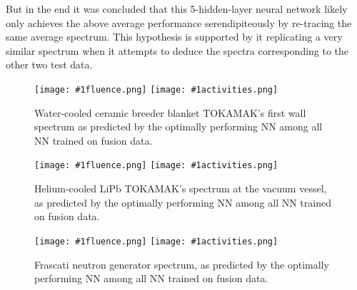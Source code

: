\documentclass[a4paper, 12pt]{article}
\newcommand{\fluenceandactivities}[1]{
\texttt{[image: \#1fluence.png]}
\texttt{[image: \#1activities.png]}
}
\begin{document}
But in the end it was concluded that this 5-hidden-layer neural network likely only achieves the above average performance serendipiteously by re-tracing the same average spectrum. This hypothesis is supported by it replicating a very similar spectrum when it attempts to deduce the spectra corresponding to the other two test data. 

\begin{figure}[H]
\centering
\fluenceandactivities{/home/ocean/Documents/GitHubDir/unfolding/unfolding/unfoldingsuite/neuralnetwork/realoutputEarlyStopping/SelectedNNreplicated/fusion-fusion/0918_0332_5_layer_top_right_anomaly_test_001_}
\caption{Water-cooled ceramic breeder blanket TOKAMAK's first wall spectrum as predicted by the optimally performing NN among all NN trained on fusion data.}\label{5Layerfusion-fusionWCCB-FW}
\end{figure}

\begin{figure}[H]
\centering
\fluenceandactivities{/home/ocean/Documents/GitHubDir/unfolding/unfolding/unfoldingsuite/neuralnetwork/realoutputEarlyStopping/SelectedNNreplicated/fusion-fusion/0918_0332_5_layer_top_right_anomaly_test_001_}
\caption{Helium-cooled LiPb TOKAMAK's spectrum at the vacuum vessel, as predicted by the optimally performing NN among all NN trained on fusion data.}\label{5Layerfusion-fusionHCLL-VV}
\end{figure}

\begin{figure}[H]
\centering
\fluenceandactivities{/home/ocean/Documents/GitHubDir/unfolding/unfolding/unfoldingsuite/neuralnetwork/realoutputEarlyStopping/SelectedNNreplicated/fusion-fusion/0918_0332_5_layer_top_right_anomaly_test_000_}
\caption{Frascati neutron generator spectrum, as predicted by the optimally performing NN among all NN trained on fusion data.}\label{5Layerfusion-fusionFNG}
\end{figure}


\end{document}
